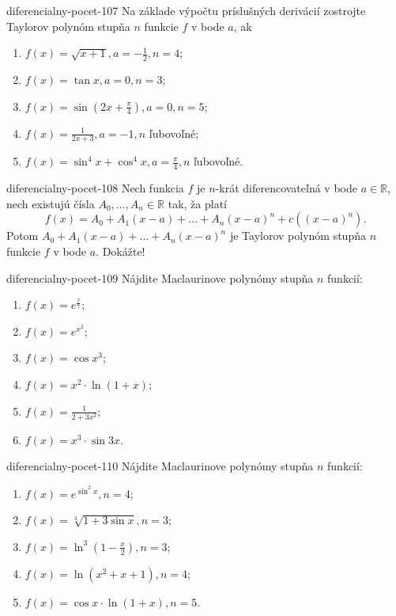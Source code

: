 \begin{defproblem}{diferencialny-pocet-107}
Na základe výpočtu príslušných derivácií zostrojte Taylorov polynóm stupňa $n$ funkcie $f$ v bode $a$, ak
\begin{enumerate}
\item $f(x)=\sqrt{x+1},a=-\frac{1}{2},n=4$;
\item $f(x)=\tan x,a=0,n=3$;
\item $f(x)=\sin (2x+\frac{\pi}{4}),a=0,n=5$;
\item $f(x)=\frac{1}{2x+3},a=-1,n$ ľubovoľné;
\item $f(x)=\sin^4 x+\cos^4 x,a=\frac{\pi}{4},n$ ľubovoľné.
\end{enumerate}
\end{defproblem}

\begin{defproblem}{diferencialny-pocet-108}
Nech funkcia $f$ je $n$-krát diferencovateľná v bode $a\in\mathbb{R}$, nech existujú čísla $A_0,...,A_n\in\mathbb{R}$ tak, ža platí
$$f(x)=A_0+A_1(x-a)+...+A_n(x-a)^n+c((x-a)^n).$$ Potom  $A_0+A_1(x-a)+...+A_n(x-a)^n$ je Taylorov polynóm stupňa $n$ funkcie $f$ v bode $a$. Dokážte!
\end{defproblem}

\begin{defproblem}{diferencialny-pocet-109}
Nájdite Maclaurinove polynómy stupňa $n$ funkcií:
\begin{multicols}{2}
\begin{enumerate}
    \item $f(x)=e^{\frac{x}{7}}$;
	\item $f(x)=e^{x^2}$;
	\item $f(x)=\cos x^3$;
	\item $f(x)=x^2\cdot\ln (1+x)$;
	\item $f(x)=\frac{1}{2+3x^2}$;
	\item $f(x)=x^3\cdot\sin 3x$.
\end{enumerate}
\end{multicols}
\end{defproblem}

\begin{defproblem}{diferencialny-pocet-110}
Nájdite Maclaurinove polynómy stupňa $n$ funkcií:
\begin{multicols}{2}
\begin{enumerate}
    \item $f(x)=e^{\sin^2 x},n=4$;
	\item $f(x)=\sqrt[3]{1+3\sin x},n=3$;
	\item $f(x)=\ln^3 (1-\frac{x}{2}),n=3$;
	\item $f(x)=\ln (x^2+x+1),n=4$;
	\item $f(x)=\cos x\cdot\ln (1+x),n=5$.
\end{enumerate}
\end{multicols}
\end{defproblem}

